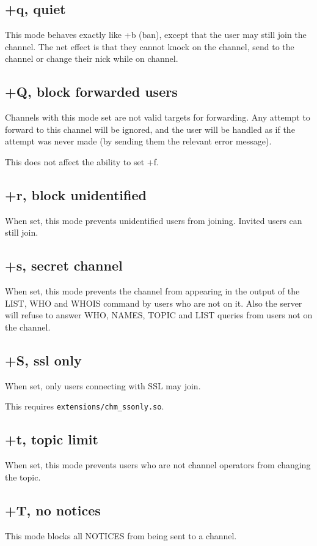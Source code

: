 \subsection{+q, quiet}

	This mode behaves exactly like +b (ban), except that the user may still
	join the channel. The net effect is that they cannot knock on the
	channel, send to the channel or change their nick while on channel.

\subsection{+Q, block forwarded users}

	Channels with this mode set are not valid targets for forwarding. Any
	attempt to forward to this channel will be ignored, and the user will
	be handled as if the attempt was never made (by	sending them the
	relevant error message).

	This does not affect the ability to set +f.

\subsection{+r, block unidentified}
	When set, this mode prevents unidentified users from joining. Invited
	users can still join.

\subsection{+s, secret channel}
	When set, this mode prevents the channel from appearing in the output
	of the LIST, WHO and WHOIS command by users who are not on it. Also
	the server will refuse to answer WHO, NAMES, TOPIC and LIST queries
	from users not on the channel.

\subsection{+S, ssl only}
	When set, only users connecting with SSL may join.

	This requires \nolinkurl{extensions/chm\_ssonly.so}.

\subsection{+t, topic limit}
	When set, this mode prevents users who are not channel operators from
	changing the topic.

\subsection{+T, no notices}
	This mode blocks all NOTICES from being sent to a channel.

